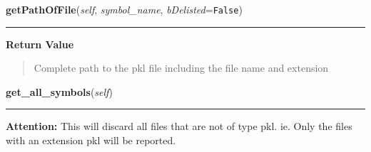    \label{QSTK:qstkutil:DataAccess:DataAccess:getPathOfFile}

    \vspace{0.5ex}

\hspace{.8\funcindent}\begin{boxedminipage}{\funcwidth}

    \raggedright \textbf{getPathOfFile}(\textit{self}, \textit{symbol\_name}, \textit{bDelisted}={\tt False})

    \vspace{-1.5ex}

    \rule{\textwidth}{0.5\fboxrule}
\setlength{\parskip}{2ex}
\setlength{\parskip}{1ex}
      \textbf{Return Value}
    \vspace{-1ex}

      \begin{quote}
      Complete path to the pkl file including the file name and extension

      \end{quote}

    \end{boxedminipage}

    \label{QSTK:qstkutil:DataAccess:DataAccess:get_all_symbols}

    \vspace{0.5ex}

\hspace{.8\funcindent}\begin{boxedminipage}{\funcwidth}

    \raggedright \textbf{get\_all\_symbols}(\textit{self})

    \vspace{-1.5ex}

    \rule{\textwidth}{0.5\fboxrule}
\setlength{\parskip}{2ex}
\setlength{\parskip}{1ex}
\textbf{Attention:} This will discard all files that are not of type pkl. ie. Only the files 
with an extension pkl will be reported.



    \end{boxedminipage}

